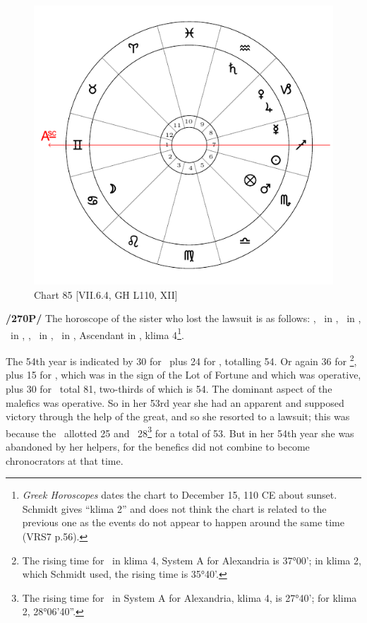 \newpage 
\begin{figure}
\centering
\vspace{0pt}
\includegraphics[width=.68\textwidth]{charts/7_6_04}
\caption{Chart 85 [VII.6.4, GH L110, XII]}
\label{fig:chart85}
\end{figure} 

\noindent\textbf{/270P/} The horoscope of the sister who lost the lawsuit is as follows: \Sun, \Mercury\, in \Sagittarius, \Moon\, in \Cancer, \Saturn\, in \Aquarius, \Jupiter, \Venus\, in \Capricorn, \Mars\, in \Scorpio, Ascendant in \Gemini, klima 4\footnote{\textit{Greek Horoscopes} dates the chart to December 15, 110 CE about sunset. Schmidt gives ``klima 2'' and does not think the chart is related to the previous one as the events do not appear to happen around the same time (VRS7 p.56).}.

The 54th year is indicated by 30 for \Saturn\, plus 24 for \Venus, totalling 54. Or again 36 for \Scorpio\footnote{The rising time for \Scorpio\, in klima 4, System A for Alexandria is 37°00'; in klima 2, which Schmidt used, the rising time is 35°40'.}, plus 15 for \Mars, which was in the sign of the Lot of Fortune and which was operative, plus 30
for \Saturn\, total 81, two-thirds of which is 54. The dominant aspect of the malefics was operative. So in her 53rd year she had an apparent and supposed victory through the help of the great, and so she resorted to a lawsuit; this was because the \Moon\, allotted 25 and \Capricorn\, 28\footnote{The rising time for \Capricorn\, in System A for Alexandria, klima 4, is 27°40'; for klima 2, 28°06'40''.} for a total of 53. But in her 54th year
she was abandoned by her helpers, for the benefics did not combine to become chronocrators at that time.

